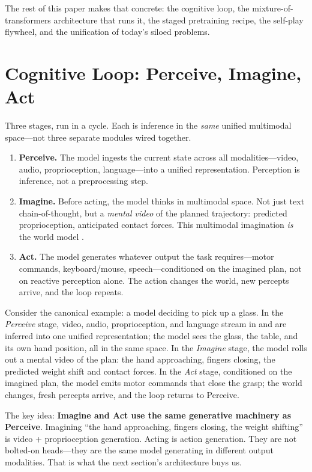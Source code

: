 \documentclass[10pt,conference]{IEEEtran}
\begin{document}
The rest of this paper makes that concrete: the cognitive loop, the
mixture-of-transformers architecture that runs it, the staged pretraining recipe,
the self-play flywheel, and the unification of today's siloed problems.

\section{Cognitive Loop: Perceive, Imagine, Act}
Three stages, run in a cycle. Each is inference in the \emph{same} unified
multimodal space---not three separate modules wired together.

\begin{enumerate}
\item \textbf{Perceive.} The model ingests the current state across all
modalities---video, audio, proprioception, language---into a unified
representation. Perception is inference, not a preprocessing step.
\item \textbf{Imagine.} Before acting, the model thinks in multimodal space. Not
just text chain-of-thought, but a \emph{mental video} of the planned trajectory:
predicted proprioception, anticipated contact forces. This multimodal
imagination \emph{is} the world model \cite{ref11,ref12}.
\item \textbf{Act.} The model generates whatever output the task
requires---motor commands, keyboard/mouse, speech---conditioned on the imagined
plan, not on reactive perception alone. The action changes the world, new
percepts arrive, and the loop repeats.
\end{enumerate}

Consider the canonical example: a model deciding to pick up a glass. In the
\emph{Perceive} stage, video, audio, proprioception, and language stream in and
are inferred into one unified representation; the model sees the glass, the
table, and its own hand position, all in the same space. In the \emph{Imagine}
stage, the model rolls out a mental video of the plan: the hand approaching,
fingers closing, the predicted weight shift and contact forces. In the
\emph{Act} stage, conditioned on the imagined plan, the model emits motor
commands that close the grasp; the world changes, fresh percepts arrive, and the
loop returns to Perceive.

The key idea: \textbf{Imagine and Act use the same generative machinery as
Perceive}. Imagining ``the hand approaching, fingers closing, the weight
shifting'' is video + proprioception generation. Acting is action generation.
They are not bolted-on heads---they are the same model generating in different
output modalities. That is what the next section's architecture buys us.
\end{document}
